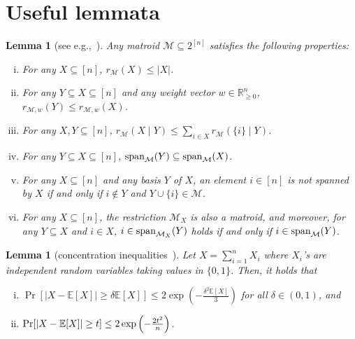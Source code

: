 \documentclass[11pt]{article}
\def \E {\mathbb{E}}
\newcommand{\M}{{\mathcal M}}
\def \P {\textnormal{Pr}}
\newcommand{\spa}{\textnormal{span}}
\newcommand{\R}{{\mathbb R}}
\newtheorem{lemma}[theorem]{Lemma}
\begin{document}
\section{Useful lemmata}\label{sec:lemmata}
\begin{lemma}[see e.g.,~\cite{welsh2010matroid}]\label{lem:matroid_properties}
Any matroid $\M\subseteq 2^{[n]}$ satisfies the following properties:
\begin{enumerate}[i.]
    \item\label{fact:rank_bounded} For any $X\subseteq[n]$, $r_{\M}(X)\le|X|$.
    \item\label{fact:rank_monotone} For any $Y\subseteq X\subseteq[n]$ and any weight vector $w\in\R_{\ge0}^n$, $r_{\M,w}(Y)\le r_{\M,w}(X)$.
    \item\label{fact:rank_marginal_subadditive} For any $X,Y\subseteq [n]$, $r_{\M}(X\mid Y)\le\sum_{i\in X} r_{\M}(\{i\}\mid Y)$.
    \item\label{fact:span_monotone} For any $Y\subseteq X\subseteq[n]$, $\spa_{\M}(Y)\subseteq \spa_{\M}(X)$.
    \item\label{fact:span_of_basis} For any $X\subseteq[n]$ and any basis $Y$ of $X$, an element $i\in[n]$ is not spanned by $X$ if and only if $i\notin Y$ and $Y\cup\{i\}\in\M$.
    \item\label{fact:matroid_restriction} For any $X\subseteq [n]$, the restriction $\M_{X}$ is also a matroid, and moreover, for any $Y\subseteq X$ and $i\in X$, $i\in\spa_{\M_X}(Y)$ holds if and only if $i\in\spa_{\M}(Y)$.
\end{enumerate}
\end{lemma}

\begin{lemma}[concentration inequalities~\citep{chernoff1952measure,hoeffding1994probability}]\label{lem:concentration}
Let $X=\sum_{i=1}^n X_i$ where $X_i$'s are independent random variables taking values in $\{0,1\}$. Then, it holds that
\begin{enumerate}[i.]
    \item\label{chernoff} $\Pr[|X-\E[X]|\ge \delta \E[X]]\le 2\exp\left(-\frac{\delta^2 \E[X]}{3}\right)$ for all $\delta\in (0,1)$, and
    \item\label{hoeffding} $\P[|X-\E[X]|\ge t]\le 2\exp\left(-\frac{2t^2}{n}\right)$.
\end{enumerate}
\end{lemma}
\end{document}
